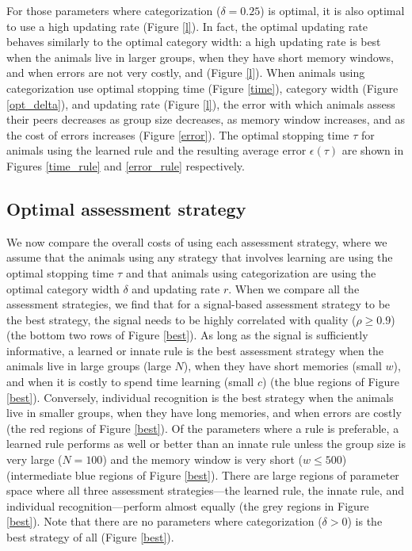 For those parameters where categorization ($\delta=0.25$) is optimal, it is also optimal to use a high updating rate (Figure \ref{l}). In fact, the optimal updating rate behaves similarly to the optimal category width: a high updating rate is best when the animals live in larger groups, when they have short memory windows, and when errors are not very costly, and  (Figure \ref{l}). When animals using categorization use optimal stopping time (Figure \ref{time}), category width (Figure \ref{opt_delta}), and updating rate (Figure \ref{l}), the error with which animals assess their peers decreases as group size decreases, as memory window increases, and as the cost of errors increases (Figure \ref{error}). The optimal stopping time $\tau$ for animals using the learned rule and the resulting average error $\epsilon(\tau)$ are shown in Figures \ref{time_rule} and \ref{error_rule} respectively.


\subsection*{Optimal assessment strategy}
We now compare the overall costs of using each assessment strategy, where we assume that the animals using any strategy that involves learning are using the optimal stopping time $\tau$ and that animals using categorization are using the optimal category width $\delta$ and updating rate $r$. When we compare all the assessment strategies, we find that for a signal-based assessment strategy to be the best strategy, the signal needs to be highly correlated with quality ($\rho\geq0.9$) (the bottom two rows of Figure \ref{best}). As long as the signal is sufficiently informative, a learned or innate rule is the best assessment strategy when the animals live in large groups (large $N$), when they have short memories (small $w$), and when it is costly to spend time learning (small $c$) (the blue regions of Figure \ref{best}). Conversely, individual recognition is the best strategy when the animals live in smaller groups, when they have long memories, and when errors are costly (the red regions of Figure \ref{best}). Of the parameters where a rule is preferable, a learned rule performs as well or better than an innate rule unless the group size is very large ($N=100$) and the memory window is very short ($w\leq500$) (intermediate blue regions of Figure \ref{best}). There are large regions of parameter space where all three assessment strategies---the learned rule, the innate rule, and individual recognition---perform almost equally (the grey regions in Figure \ref{best}). Note that there are no parameters where categorization ($\delta>0$) is the best strategy of all (Figure \ref{best}).  

